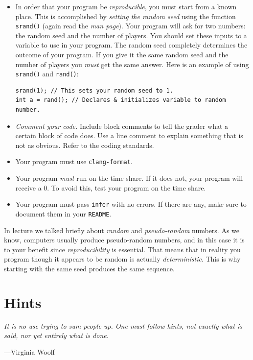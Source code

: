 \documentclass{article}
\begin{document}
\begin{itemize}
\item In order that your program be \emph{reproducible}, you must start from a
known place. This is accomplished by \emph{setting the random seed}
using the function \texttt{srand()} (again read the \emph{man page}).
Your program will ask for two numbers: the random seed and the
number of players. You should set these inputs to a variable to use
in your program. The random seed completely determines the outcome of your program. If you give it
the same random seed and the number of players you \emph{must} get
the same answer. Here is an example of using \texttt{srand()} and
\texttt{rand()}:
\begin{lstlisting}
srand(1); // This sets your random seed to 1.
int a = rand(); // Declares & initializes variable to random number.
\end{lstlisting}

\item \emph{Comment your code.} Include block comments to tell the grader what a certain block of code does. Use a line comment to explain something that is not as obvious. Refer to the coding standards.

\item Your program must use \texttt{clang-format}.

\item Your program \emph{must} run on the time share. If it does not, your program will receive a 0. To avoid this, test your program on the time share.

\item Your program must pass \texttt{infer} with no errors. If there are any, make sure to document them in your \texttt{README}.

\end{itemize}

In lecture we talked briefly about \emph{random} and \emph{pseudo-random}
numbers. As we know, computers usually produce pseudo-random numbers,
and in this case it is to your benefit since \emph{reproducibility}
is essential. That means that in reality you program though it
appears to be random is actually \emph{deterministic}. This is why
starting with the same seed produces the same sequence.

\section{Hints}
\epigraph{\emph{It is no use trying to sum people up. One must follow hints,
not exactly what is said, nor yet entirely what is done.}}{---Virginia Woolf}
\end{document}
